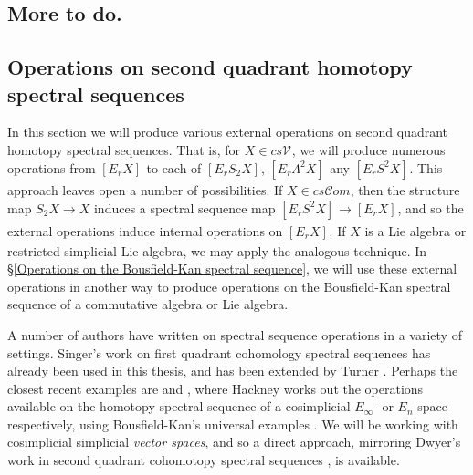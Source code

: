 \documentclass[11pt]{amsart} \renewcommand{\baselinestretch}{1.4}
\theoremstyle{plain}
\theoremstyle{definition}
\renewcommand{\to}{\longrightarrow}
\newcommand{\scrC}{\mathscr{C}}
\newcommand{\calV}{\mathcal{V}}
\newcommand{\vect}[2]{\calV^{#1}_{#2}}
\newcommand{\ExtCohOp}{\mathrm{Sq}_\mathrm{ext}}
\newcommand{\hExtCohOp}{\mathrm{Sq}_\mathrm{h,ext}}
\newcommand{\algs}{{\scrC\!\textit{om}}}
\newcommand{\E}[5]{[E^{#1}_{#2}#3]^{#4}_{#5}}
\newcommand{\uver}{^\mathrm{v}}
\newcommand{\dhor}{_\mathrm{h}}
\begin{document}
\begin{Calculations of HWn for n nonzero}
\subsection{More to do.}





\end{Calculations of HWn for n nonzero}

\begin{second quadrant homotopy sseq operations}

\section{\textbf{Operations on second quadrant homotopy spectral sequences}}
\label{second quadrant homotopy sseq operations}


In this section we will produce various external operations on second quadrant homotopy spectral sequences. That is, for $X\in cs\vect{}{}$, we will produce numerous operations
from $\E{}{r}{X}{}{}$ to each of $\E{}{r}{S_2X}{}{}$, $\E{}{r}{\Lambda^2 X}{}{}$ any $\E{}{r}{S^2X}{}{}$. This approach leaves open a number of possibilities. If $X\in cs\algs$, then the structure map $S_2X\to X$ induces a spectral sequence map $\E{}{r}{S^2X}{}{}\to \E{}{r}{X}{}{}$, and so the external operations induce internal operations on $\E{}{r}{X}{}{}$. If $X$ is a Lie algebra or restricted simplicial Lie algebra, we may apply the analogous technique. In \S\ref{Operations on the Bousfield-Kan spectral sequence}, we will use these external operations in another way to produce operations on the Bousfield-Kan spectral sequence of a commutative algebra or Lie algebra.

A number of authors have written on spectral sequence operations in a variety of settings. Singer's work \cite{MR2245560} on first quadrant cohomology spectral sequences has already been used in this thesis, and has been extended by Turner \cite{turner_opns_and_sseqs_I.pdf}. 
 Perhaps the closest recent examples are \cite{2011arXiv1101.3798H} and \cite{2011arXiv1102.0020H}, where Hackney works out the operations available on the homotopy spectral sequence of a cosimplicial $E_\infty$- or $E_n$-space respectively, using Bousfield-Kan's universal examples \cite{BK_pairings.pdf}. We will be working with cosimplicial simplicial \emph{vector spaces}, and so a direct approach, mirroring Dwyer's work in second quadrant cohomotopy spectral sequences \cite{DwyerHigherDividedSquares.pdf}, is available. 


\end{second quadrant homotopy sseq operations}
\end{document}
